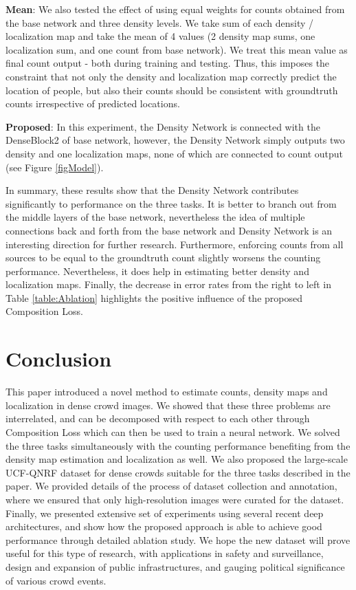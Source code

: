 \documentclass[runningheads]{llncs}
\begin{document}
\smallskip

\noindent\textbf{Mean}: We also tested the effect of using equal weights for counts obtained from the base network and three density levels. We take sum of each density / localization map and take the mean of 4 values (2 density map sums, one localization sum, and one count from base network). We treat this mean value as final count output - both during training and testing. Thus, this imposes the constraint that not only the density and localization map correctly predict the location of people, but also their counts should be consistent with groundtruth counts irrespective of predicted locations.

\smallskip

\noindent\textbf{Proposed}: In this experiment, the Density Network is connected with the DenseBlock2 of base network, however, the Density Network simply outputs two density and one localization maps, none of which are connected to count output (see Figure \ref{figModel}).

\smallskip

In summary, these results show that the Density Network contributes significantly to performance on the three tasks. It is better to branch out from the middle layers of the base network, nevertheless the idea of multiple connections back and forth from the base network and Density Network is an interesting direction for further research. Furthermore, enforcing counts from all sources to be equal to the groundtruth count slightly worsens the counting performance. Nevertheless, it does help in estimating better density and localization maps. Finally, the decrease in error rates from the right to left in Table \ref{table:Ablation} highlights the positive influence of the proposed Composition Loss.


\section{Conclusion}\label{secConclusion}
This paper introduced a novel method to estimate counts, density maps and localization in dense crowd images. We showed that these three problems are interrelated, and can be decomposed with respect to each other through Composition Loss which can then be used to train a neural network. We solved the three tasks simultaneously with the counting performance benefiting from the density map estimation and localization as well. We also proposed the large-scale UCF-QNRF dataset for dense crowds suitable for the three tasks described in the paper. We provided details of the process of dataset collection and annotation, where we ensured that only high-resolution images were curated for the dataset. Finally, we presented extensive set of experiments using several recent deep architectures, and show how the proposed approach is able to achieve good performance through detailed ablation study. We hope the new dataset will prove useful for this type of research, with applications in safety and surveillance, design and expansion of public infrastructures, and gauging political significance of various crowd events.
\end{document}
